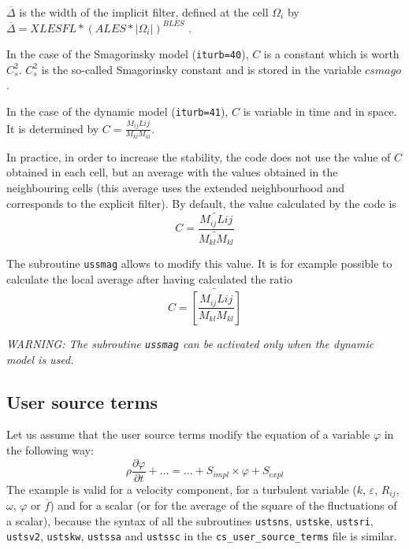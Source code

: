{{{$\overline{\Delta}$ is the width of the implicit filter, defined at the
cell $\Omega_i$ by \\
$\overline{\Delta}=XLESFL*(ALES*|\Omega_i|)^{BLES}$
.

In the case of the Smagorinsky model (\texttt{iturb=40}), $C$ is a
constant which is worth $C_s^2$. $C_s^2$ is the so-called Smagorinsky
constant and is stored in the variable \texttt{$csmago$}.

In the case of the dynamic model (\texttt{iturb=41}), $C$ is variable in
time and in space. It is determined by
$\displaystyle C=\frac{M_{ij}L{ij}}{M_{kl}M_{kl}}$.

In practice, in order to increase the stability, the code does not use the
value of $C$ obtained in each cell, but an average with the values
obtained in the neighbouring cells (this average uses the extended
neighbourhood and corresponds to the explicit filter). By default, the
value calculated by the code is
\begin{displaymath}
C=\frac{\widetilde{M_{ij}L{ij}}}{\widetilde{M_{kl}M_{kl}}}
\end{displaymath}

The subroutine \texttt{ussmag} allows to modify this value. It is for
example possible to calculate the local average after having calculated the
ratio
\begin{displaymath}
C=\widetilde{\left[\frac{M_{ij}L{ij}}{M_{kl}M_{kl}}\right]}
\end{displaymath}

{\em WARNING: The subroutine {\em\texttt{ussmag}} can be activated only when
the dynamic model is used.}

\subsection{User source terms}
\label{sec:prg_usersourceterms}

Let us assume that the user source terms modify the equation of a
variable $\varphi$ in the following way:
\begin{displaymath}
\rho\frac{\partial \varphi}{\partial t}+\ldots = \ldots + S_{impl}\times\varphi+S_{expl}
\end{displaymath}
The example is valid for a velocity component, for a turbulent variable ($k$, $\varepsilon$, $R_{ij}$, $\omega$,
$\varphi$ or $\overline{f}$) and for a scalar (or for the average of the
square of the fluctuations of a scalar), because the syntax of all the
subroutines \texttt{ustsns}, \texttt{ustske}, \texttt{ustsri}, \texttt{ustsv2},
\texttt{ustskw}, \texttt{ustssa} and \texttt{ustssc} in the \texttt{cs\_user\_source\_terms} file is similar.

}}}
